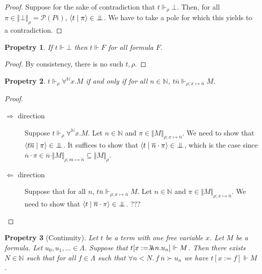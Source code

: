 \documentclass{article}
\newcommand{\N}{\mathbb{N}}
\newcommand{\proc}[2]{\langle{#1}\mid{#2}\rangle}
\newcommand{\depforall}[1]{\forall^\N #1.}
\newcommand{\pole}{{\bot\mkern-10mu\bot}}
\newcommand{\realizes}{\Vdash}
\newcommand{\oracle}[2]{\lambda\mkern-15mu\lambda\ #1. #2}
\newcommand{\terminterp}[2]{\Vert #1 \Vert_{#2}}
\newcommand{\powerset}[1]{\mathcal{P}(#1)}
\newtheorem{property}{Propetry}
\begin{document}
\begin{proof}
    Suppose for the sake of contradiction that $t \realizes_\rho \bot$.
    Then, for all $\pi \in \terminterp{\bot}{\rho} = \powerset{Pi}$, $\proc{t}{\pi} \in \pole$. We have to take a pole for which this yields to a contradiction.
\end{proof}

\begin{property}
    If $t \realizes \bot$ then $t \realizes F$ for all formula $F$.
\end{property}

\begin{proof}
    By consistency, there is no such $t, \rho$.
\end{proof}

\begin{property}
    $t \realizes_\rho \depforall{x} M$ if and only if for all $n \in \N$, $t \overline{n} \realizes_{\rho; x \mapsto \overline{n}} M$.
\end{property}

\begin{proof}
    \
    \begin{description}
        \item[$\Rightarrow$ direction] Suppose $t \realizes_\rho \depforall{x} M$.
        Let $n \in \N$ and $\pi \in \terminterp{M}{\rho; x \mapsto \overline{n}}$.
        We need to show that $\proc{t \overline{n}}{\pi} \in \pole$.
        It suffices to show that $\proc{t}{\overline{n}\cdot\pi} \in \pole$, which is the case since $\overline{n} \cdot \pi \in \overline{n} \cdot \terminterp{M}{\rho; m \mapsto \overline{n}} \subseteq \terminterp{M}{\rho}$.
        \item[$\Leftarrow$ direction] Suppose that for all $n$, $t \overline{n} \realizes_{\rho; x \mapsto \overline{n}} M$.
        Let $n \in \N$ and $\pi \in \terminterp{M}{\rho; x \mapsto \overline{n}}$.
        We need to show that $\proc{t}{\overline{n} \cdot \pi} \in \pole$. ???
    \end{description}
\end{proof}

\begin{property}[Continuity]
    Let $t$ be a term with one free variable $x$.
    Let $M$ be a formula.
    Let $u_0, u_1, \dots \in \Lambda$.
    Suppose that $t[x := \oracle{n}{u_n}] \realizes M$.
    Then there exists $N \in \N$ such that for all $f \in \Lambda$ such that $\forall n < N.\ f\ \overline{n} \succ u_n$ we have $t[x := f] \realizes M$.
\end{property}
\end{document}
